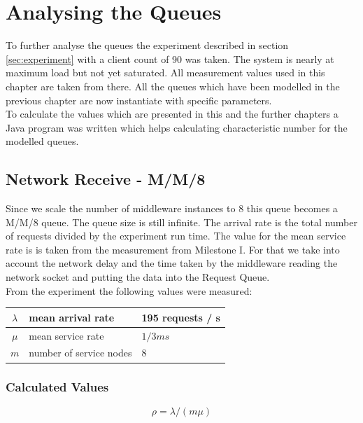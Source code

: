 \documentclass[a4paper]{article}
\begin{document}
\section{Analysing the Queues}

To further analyse the queues the experiment described in section \ref{sec:experiment} with a client count of 90 was taken. The system is nearly at maximum load but not yet saturated. All measurement values used in this chapter are taken from there. All the queues which have been modelled in the previous chapter are now instantiate with specific parameters.\\

To calculate the values which are presented in this and the further chapters a Java program was written which helps calculating characteristic number for the modelled queues.

\subsection{Network Receive - M/M/8}
\label{sub:QueueNwReceive}

Since we scale the number of middleware instances to 8 this queue becomes a M/M/8 queue. The queue size is still infinite. The arrival rate is the total number of requests divided by the experiment run time. The value for the mean service rate is is taken from the measurement from Milestone I. For that we take into account the network delay and the time taken by the middleware reading the network socket and putting the data into the Request Queue.\\

From the experiment the following values were measured:

\begin{tabular}{|c|l|l|}
\hline 
$\lambda$ & mean arrival rate & 195 requests / s \\ 
\hline 
$\mu$ & mean service rate & ${1 / {3ms}}$\\ 
\hline 
$m$ & number of service nodes & 8 \\ 
\hline 
\end{tabular} 

\subsubsection{Calculated Values}
\begin{equation}
\label{eq:TrafficIntensity}
\rho = \lambda / (m \mu)
\end{equation}
\end{document}
